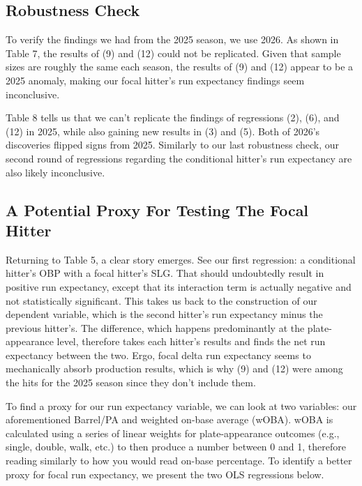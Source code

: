 \documentclass{article}
\newcommand{\tbl}[1]{}
\begin{document}
\subsection{Robustness Check}

To verify the findings we had from the 2025 season, we use 2026. As shown in Table 7, the results of (9) and (12) could not be replicated. Given that sample sizes are roughly the same each season, the results of (9) and (12) appear to be a 2025 anomaly, making our focal hitter's run expectancy findings seem inconclusive.

Table 8 tells us that we can't replicate the findings of regressions (2), (6), and (12) in 2025, while also gaining new results in (3) and (5). Both of 2026's discoveries flipped signs from 2025. Similarly to our last robustness check, our second round of regressions regarding the conditional hitter's run expectancy are also likely inconclusive.

\subsection{A Potential Proxy For Testing The Focal Hitter}

Returning to Table 5, a clear story emerges. See our first regression: a conditional hitter's OBP with a focal hitter's SLG. That should undoubtedly result in positive run expectancy, except that its interaction term is actually negative and not statistically significant. This takes us back to the construction of our dependent variable, which is the second hitter's run expectancy minus the previous hitter's. The difference, which happens predominantly at the plate-appearance level, therefore takes each hitter's results and finds the net run expectancy between the two. Ergo, focal delta run expectancy seems to mechanically absorb production results, which is why (9) and (12) were among the hits for the 2025 season since they don't include them.

To find a proxy for our run expectancy variable, we can look at two variables: our aforementioned Barrel/PA and weighted on-base average (wOBA). wOBA is calculated using a series of linear weights for plate-appearance outcomes (e.g., single, double, walk, etc.) to then produce a number between 0 and 1, therefore reading similarly to how you would read on-base percentage. To identify a better proxy for focal run expectancy, we present the two OLS regressions below.

\tbl{proxy_regressions}
\end{document}
